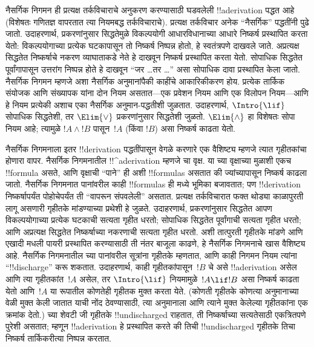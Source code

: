 \documentclass[../../../include/open-logic-section]{subfiles}
\begin{document}
      {}
      {}


नैसर्गिक निगमन ही प्रत्यक्ष तर्कविचाराचे अनुकरण करण्यासाठी घडवलेली
!!a{derivation} पद्धत आहे (विशेषतः गणितज्ञ वापरतात त्या नियमबद्ध
तर्कविचाराचे). प्रत्यक्ष तर्कविचार अनेक ``नैसर्गिक'' पद्धतींनी पुढे जातो.
उदाहरणार्थ, प्रकरणांनुसार सिद्धतेमुळे विकल्पयोगी आधारविधानाच्या आधारे
निष्कर्ष प्रस्थापित करता येतो: विकल्पयोगाच्या प्रत्येक घटकापासून
तो निष्कर्ष निष्पन्न होतो, हे स्वतंत्रपणे दाखवले जाते. अप्रत्यक्ष सिद्धतेत
निष्कर्षाचे नकरण व्याघाताकडे नेते हे दाखवून निष्कर्ष प्रस्थापित करता येतो.
सोपाधिक सिद्धतेत पूर्वांगापासून उत्तरांग निष्पन्न होते हे दाखवून
``जर \dots तर \dots'' असा सोपाधिक दावा प्रस्थापित केला जातो. नैसर्गिक
निगमन म्हणजे अशा नैसर्गिक अनुमानांपैकी काहींचे आकारिकीकरण होय. प्रत्येक
तार्किक संयोजक आणि संख्यापक यांना दोन नियम असतात—एक प्रवेशन नियम आणि एक
विलोपन नियम—आणि हे नियम प्रत्येकी अशाच एका नैसर्गिक अनुमान-पद्धतीशी
जुळतात. उदाहरणार्थ, $\Intro{\lif}$ सोपाधिक सिद्धतेशी, तर $\Elim{\lor}$
प्रकरणांनुसार सिद्धतेशी जुळतो. $\Elim{\land}$ हा विशेषतः सोपा नियम आहे;
त्यामुळे $!A \land !B$ पासून~$!A$ (किंवा $!B$) असा निष्कर्ष काढता येतो.

नैसर्गिक निगमनाला इतर !!{derivation} पद्धतींपासून वेगळे करणारे एक
वैशिष्ट्य म्हणजे त्यात गृहीतकांचा होणारा वापर. नैसर्गिक निगमनातील
!!^a{derivation} म्हणजे चा वृक्ष. या च्या
वृक्षाच्या मुळाशी एकच !!{formula} असते, आणि वृक्षाची ``पाने'' ही अशी
!!{formula}s असतात की ज्यांच्यापासून निष्कर्ष काढला जातो. नैसर्गिक
निगमनात पानांवरील काही !!{formula}s ही मध्ये भूमिका बजावतात;
पण !!{derivation} निष्कर्षापर्यंत पोहोचेपर्यंत ती ``वापरून संपवलेली'' असतात.
प्रत्यक्ष तर्कविचारात फक्त थोड्या काळापुरती लागू असणारी गृहीतके मांडण्याच्या
प्रथेशी हे जुळते. उदाहरणार्थ, प्रकरणांनुसार सिद्धतेत आपण विकल्पयोगाच्या
प्रत्येक घटकाची सत्यता गृहीत धरतो; सोपाधिक सिद्धतेत पूर्वांगाची सत्यता
गृहीत धरतो; आणि अप्रत्यक्ष सिद्धतेत निष्कर्षाच्या नकरणाची सत्यता गृहीत
धरतो. अशी तात्पुरती गृहीतके मांडणे आणि एखादी मधली पायरी प्रस्थापित करण्यासाठी
ती नंतर बाजूला काढणे, हे नैसर्गिक निगमनाचे खास वैशिष्ट्य आहे. नैसर्गिक
निगमनातील च्या पानांवरील सूत्रांना गृहीतके म्हणतात,
आणि काही निगमन नियम त्यांना ``!!{discharge}'' करू शकतात. उदाहरणार्थ, काही
गृहीतकांपासून~$!B$ चे असे !!a{derivation} असेल आणि त्या गृहीतकांत~$!A$
असेल, तर $\Intro{\lif}$ नियमामुळे~$!A \lif !B$ असा निष्कर्ष काढता येतो
आणि~$!A$ या रूपातील कोणतेही गृहीतक मुक्त करता येते. (कोणती गृहीतके
कोणत्या अनुमानाच्या वेळी मुक्त केली जातात याची नोंद ठेवण्यासाठी, त्या
अनुमानाला आणि त्याने मुक्त केलेल्या गृहीतकांना
एक क्रमांक देतो.) च्या शेवटी जी गृहीतके !!{undischarged}
राहतात, ती निष्कर्षाच्या सत्यतेसाठी एकत्रितपणे पुरेशी असतात; म्हणून
!!a{derivation} हे प्रस्थापित करते की तिची !!{undischarged} गृहीतके
तिचा निष्कर्ष तार्किकरीत्या निष्पन्न करतात.
\end{document}
